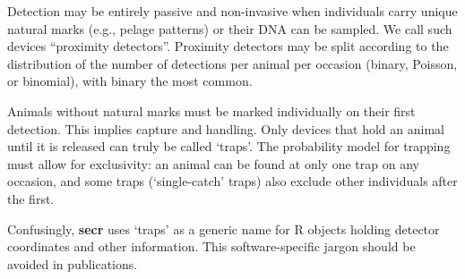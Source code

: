 \documentclass[
]{book}
\begin{document}
Detection may be entirely passive and non-invasive when individuals carry unique natural marks (e.g., pelage patterns) or their DNA can be sampled. We call such devices ``proximity detectors''. Proximity detectors may be split according to the distribution of the number of detections per animal per occasion (binary, Poisson, or binomial), with binary the most common.

Animals without natural marks must be marked individually on their first detection. This implies capture and handling. Only devices that hold an animal until it is released can truly be called `traps'. The probability model for trapping must allow for exclusivity: an animal can be found at only one trap on any occasion, and some traps (`single-catch' traps) also exclude other individuals after the first.

Confusingly, \textbf{secr} uses `traps' as a generic name for R objects holding detector coordinates and other information. This software-specific jargon should be avoided in publications.
\end{document}
